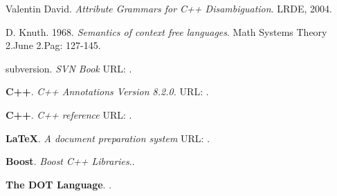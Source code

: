 \begin{thebibliography}{10}
 Valentin David. \textit{Attribute Grammars for C++ Disambiguation}. LRDE, 2004.

 D. Knuth. 1968. \textit{Semantics of context free languages}. Math Systems Theory 2.June 2.Pag: 127-145.

 subversion. \textit{SVN Book} URL: .
% 
% 

 \textbf{C++}. \textit{C++ Annotations Version 8.2.0.} URL: . 

 \textbf{C++}. \textit{C++ reference} URL: . 

 \textbf{\LaTeX}. \textit{A document preparation system} URL: .

 \textbf{Boost}. \textit{Boost C++ Libraries}.. 

 \textbf{The DOT Language}. .
 
\end{thebibliography}



